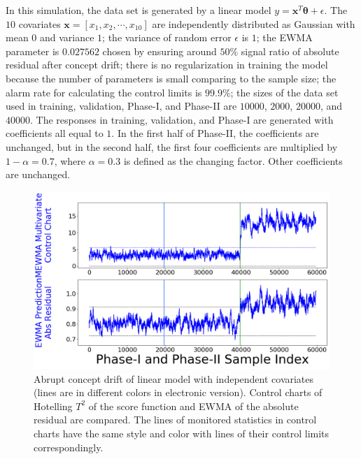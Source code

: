 \documentclass[twoside,11pt]{article}
\begin{document}
\begin{enumerate}[(I)]
In this simulation, the data set is generated by a {linear} model $y = \bm {x}^T\bm { \theta} + \epsilon$. The $10$ {covariates} {$\bm {x}=[x_1, x_2, \cdots, x _{10}]$} are independently distributed as Gaussian with mean $0$ and variance $1$; the variance of random error $ \epsilon$ is $1$; the EWMA parameter is $0.027562$ chosen by ensuring around $50\%$ signal ratio of absolute residual after concept drift; there is no regularization in training the model because the number of parameters is small comparing to the sample size; the alarm rate for calculating the control limits is $99.9\%$; the sizes of the data set used in training, validation, Phase-I, and Phase-II are $10000$, $2000$, $20000$, and $40000$. The responses in training, validation, and Phase-I are generated with coefficients all equal to $1$. In the first half of Phase-II, the coefficients are unchanged, but in the second half, the first four coefficients are multiplied by $1- \alpha=0.7$, where $ \alpha=0.3$ is defined as the changing factor. Other coefficients are unchanged.
\begin{figure}[!htp]
\centering
\includegraphics[width = 0.6\linewidth]{../figures/v14/sim_2/reg/1_sim2_lin_1e-08_0_005_1.png}
  \caption{Abrupt concept drift of linear model with independent covariates (lines are in different colors in electronic version). Control charts of Hotelling $T^2$ of the score function and EWMA of the absolute residual are compared. The lines of monitored statistics in control charts have the same style and color with lines of their control limits correspondingly.}
  \label{fig:lin_reg_ind_X_comp}
\end{figure}


\end{enumerate}
\end{document}

